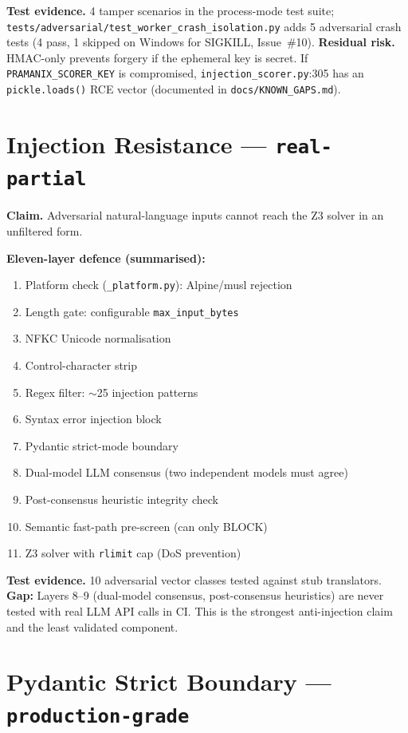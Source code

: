 \documentclass[12pt,a4paper,oneside]{report}
\newcommand{\fname}[1]{\texttt{#1}}          %
\newcommand{\code}[1]{\texttt{#1}}           %
\begin{document}
\textbf{Test evidence.}  4 tamper scenarios in the process-mode test suite;
\fname{tests/adversarial/test\_worker\_crash\_isolation.py} adds 5 adversarial
crash tests (4 pass, 1 skipped on Windows for SIGKILL, Issue~\#10).
\textbf{Residual risk.}  HMAC-only prevents forgery if the ephemeral key
is secret.  If \code{PRAMANIX\_SCORER\_KEY} is compromised,
\fname{injection\_scorer.py}:305 has an \code{pickle.loads()} RCE vector
(documented in \fname{docs/KNOWN\_GAPS.md}).

\section{Injection Resistance --- \code{real-partial}}

\textbf{Claim.}  Adversarial natural-language inputs cannot reach the Z3
solver in an unfiltered form.

\textbf{Eleven-layer defence (summarised):}

\begin{enumerate}
  \item Platform check (\fname{\_platform.py}): Alpine/musl rejection
  \item Length gate: configurable \code{max\_input\_bytes}
  \item NFKC Unicode normalisation
  \item Control-character strip
  \item Regex filter: $\sim$25 injection patterns
  \item Syntax error injection block
  \item Pydantic strict-mode boundary
  \item Dual-model LLM consensus (two independent models must agree)
  \item Post-consensus heuristic integrity check
  \item Semantic fast-path pre-screen (can only BLOCK)
  \item Z3 solver with \code{rlimit} cap (DoS prevention)
\end{enumerate}

\textbf{Test evidence.}  10 adversarial vector classes tested against stub
translators.  \textbf{Gap:} Layers 8--9 (dual-model consensus, post-consensus
heuristics) are never tested with real LLM API calls in CI.  This is the
strongest anti-injection claim and the least validated component.

\section{Pydantic Strict Boundary --- \code{production-grade}}
\end{document}
